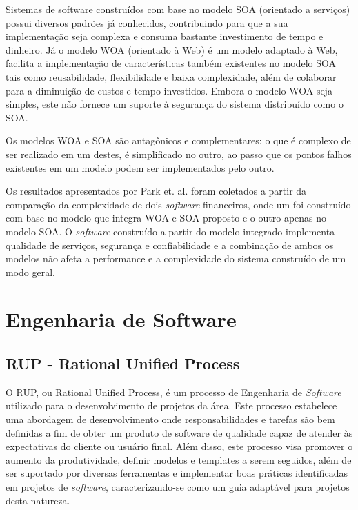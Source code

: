 Sistemas de software construídos com base no modelo SOA (orientado a serviços) possui diversos padrões já conhecidos, contribuindo para que a sua implementação seja complexa e consuma bastante investimento de tempo e dinheiro. Já o modelo WOA (orientado à Web) é um modelo adaptado à Web, facilita a implementação de características também existentes no modelo SOA tais como reusabilidade, flexibilidade e baixa complexidade, além de colaborar para a diminuição de custos e tempo investidos. Embora o modelo WOA seja simples, este não fornece um suporte à segurança do sistema distribuído como o SOA.

Os modelos WOA e SOA são antagônicos e complementares: o que é complexo de ser realizado em um destes, é simplificado no outro, ao passo que os pontos falhos existentes em um modelo podem ser implementados pelo outro.

Os resultados apresentados por Park et. al. \cite{park_integrated_2012} foram coletados a partir da comparação da complexidade de dois \textit{software} financeiros, onde um foi construído com base no modelo que integra WOA e SOA proposto e o outro apenas no modelo SOA. O \textit{software} construído a partir do modelo integrado implementa qualidade de serviços, segurança e confiabilidade e a combinação de ambos os modelos não afeta a performance e a complexidade do sistema construído de um modo geral.

\section{Engenharia de Software}

\subsection{RUP - Rational Unified Process}

O RUP, ou Rational Unified Process, é um processo de Engenharia de \textit{Software} utilizado para o desenvolvimento de projetos da área. Este processo estabelece uma abordagem de desenvolvimento onde responsabilidades e tarefas são bem definidas a fim de obter um produto de software de qualidade capaz de atender às expectativas do cliente ou usuário final. Além disso, este processo visa promover o aumento da produtividade, definir modelos e templates a serem seguidos, além de ser suportado por diversas ferramentas e implementar boas práticas identificadas em projetos de \textit{software}, caracterizando-se como um guia adaptável para projetos desta natureza\cite{rational_software_rational_1998}.

